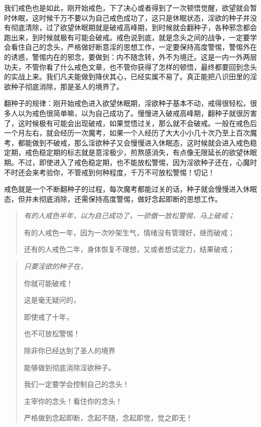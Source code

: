 \documentclass{ctexart}
\begin{document}
我们戒色也是如此，刚开始戒色，下了决心或者得到了一次顿悟觉醒，欲望就会暂时休眠，这时候千万不要以为自己戒色成功了，这只是休眠状态，淫欲的种子并没有彻底清除，过了欲望休眠期就是破戒高峰期，到时候就会翻种子，各种邪念都会跑出来，到时候就极有可能会破戒。戒色说到底，就是念头之间的战争，一定要学会看住自己的念头，严格做好断意淫的思想工作，一定要保持高度警惕，警惕外在的诱惑，警惕内在的邪念，要做到：内不随念转，外不为境迁。这是一内一外两层功夫，不管你看了什么戒色文章，也不管你获得了怎样的顿悟，最终都要回到念头的实战上来。我们凡夫能做到降伏其心，已经实属不易了。真正能把八识田里的淫欲种子彻底消除，那是圣人的境界了。

翻种子的规律：刚开始戒色进入欲望休眠期，淫欲种子基本不动，戒得很轻松，很多人以为戒色很简单嘛，以为自己成功了。慢慢进入破戒高峰期，翻种子就很厉害了，这时候极有可能会出现破戒，如果觉悟过关，那么就不会破戒。一般在戒色后一个月左右，就会经历一次魔考，如果一个人经历了大大小小几十次乃至上百次魔考，都能做到不破戒，那么淫欲种子又会慢慢进入休眠态，这时候就会进入戒色稳定期，戒色稳定期的标志就是意淫极少，煎熬感消失，有点像无限延长的欲望休眠期。不过，即使进入了戒色稳定期，也不能放松警惕，因为淫欲种子还在，心魔时不时还会来考验你，不管戒到何种程度，千万不可放松警惕！切记！

戒色就是一个不断翻种子的过程，每次魔考都能过关的话，种子就会慢慢进入休眠态，但并未彻底消除，还需保持高度警惕，做好念起即断的思想工作。

\begin{quotation}\it
    有的人戒色半年，以为自己成功了，一骄傲一放松警惕，马上破戒；

    有的人戒色一年，因为一次吵架生气，情绪没有管理好，继而破戒；

    还有的人戒色二年，身体恢复不理想，又或者想试定力，结果破戒；
\end{quotation}

\begin{quotation}\it
    只要淫欲的种子在，

    你就可能破戒！

    这是毫无疑问的，

    即使戒了十年，

    也不可放松警惕！

    除非你已经达到了圣人的境界

    能够做到彻底消除淫欲种子。

    我们一定要学会控制自己的念头！

    主宰你的念头！看住你的念头！

    严格做到念起即断，念起不随，念起即觉，觉之即无！
\end{quotation}
\end{document}
